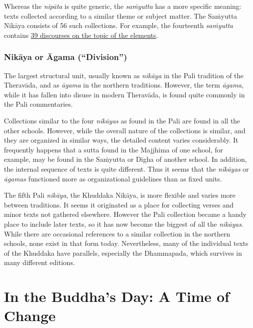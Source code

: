 \documentclass[12pt,openany]{book}%
\begin{document}
Whereas the \textit{\textsanskrit{nipāta}} is quite generic, the \textit{\textsanskrit{saṁyutta}} has a more specific meaning: texts collected according to a similar theme or subject matter. The \textsanskrit{Saṁyutta} \textsanskrit{Nikāya} consists of 56 such collections. For example, the fourteenth \textit{\textsanskrit{saṁyutta}} contains \href{sn14}{39 discourses on the topic of the elements}.

\subsubsection*{\textsanskrit{Nikāya} or Āgama (“Division”)}

The largest structural unit, usually known as \textit{\textsanskrit{nikāya}} in the Pali tradition of the \textsanskrit{Theravāda}, and as \textit{\textsanskrit{āgama}} in the northern traditions. However, the term \textit{\textsanskrit{āgama}}, while it has fallen into disuse in modern \textsanskrit{Theravāda}, is found quite commonly in the Pali commentaries.

Collections similar to the four \textit{\textsanskrit{nikāyas}} as found in the Pali are found in all the other schools. However, while the overall nature of the collections is similar, and they are organized in similar ways, the detailed content varies considerably. It frequently happens that a sutta found in the Majjhima of one school, for example, may be found in the \textsanskrit{Saṁyutta} or \textsanskrit{Dīgha} of another school. In addition, the internal sequence of texts is quite different. Thus it seems that the \textit{\textsanskrit{nikāyas}} or \textit{\textsanskrit{āgamas}} functioned more as organizational guidelines than as fixed units.

The fifth Pali \textit{\textsanskrit{nikāya}}, the Khuddaka \textsanskrit{Nikāya}, is more flexible and varies more between traditions. It seems it originated as a place for collecting verses and minor texts not gathered elsewhere. However the Pali collection became a handy place to include later texts, so it has now become the biggest of all the \textit{\textsanskrit{nikāyas}}. While there are occasional references to a similar collection in the northern schools, none exist in that form today. Nevertheless, many of the individual texts of the Khuddaka have parallels, especially the Dhammapada, which survives in many different editions.

\section*{In the Buddha’s Day: A Time of Change}
\end{document}
